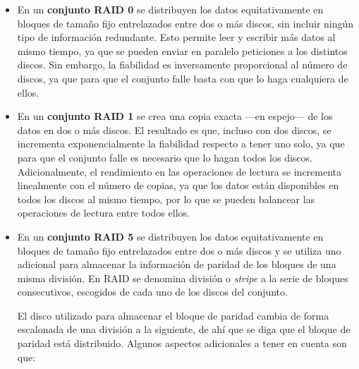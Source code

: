 \begin{itemize}
\item
  En un \textbf{conjunto RAID 0} se distribuyen los datos
  equitativamente en bloques de tamaño fijo entrelazados entre dos o más
  discos, sin incluir ningún tipo de información redundante. Esto
  permite leer y escribir más datos al mismo tiempo, ya que se pueden
  enviar en paralelo peticiones a los distintos discos. Sin embargo, la
  fiabilidad es inversamente proporcional al número de discos, ya que
  para que el conjunto falle basta con que lo haga cualquiera de ellos.
\item
  En un \textbf{conjunto RAID 1} se crea una copia exacta ---en
  espejo--- de los datos en dos o más discos. El resultado es que,
  incluso con dos discos, se incrementa exponencialmente la fiabilidad
  respecto a tener uno solo, ya que para que el conjunto falle es
  necesario que lo hagan todos los discos. Adicionalmente, el
  rendimiento en las operaciones de lectura se incrementa linealmente
  con el número de copias, ya que los datos están disponibles en todos
  los discos al mismo tiempo, por lo que se pueden balancear las
  operaciones de lectura entre todos ellos.
\item
  En un \textbf{conjunto RAID 5} se distribuyen los datos
  equitativamente en bloques de tamaño fijo entrelazados entre dos o más
  discos y se utiliza uno adicional para almacenar la información de
  paridad de los bloques de una misma división. En RAID se denomina
  división o \emph{stripe} a la serie de bloques consecutivos, escogidos
  de cada uno de los discos del conjunto.

  El disco utilizado para almacenar el bloque de paridad cambia de forma
  escalonada de una división a la siguiente, de ahí que se diga que el
  bloque de paridad está distribuido. Algunos aspectos adicionales a
  tener en cuenta son que:


\end{itemize}
